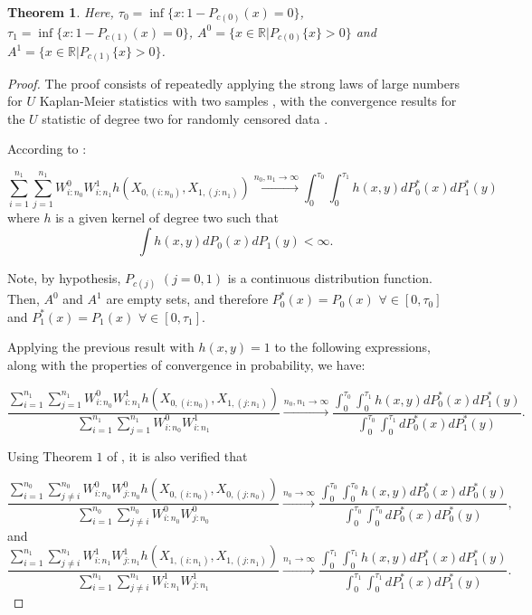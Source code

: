 \documentclass[11pt]{article}
\newtheorem{theorem}{Theorem}
\begin{document}
\begin{appendices}
\begin{theorem}{\label{consistencia}}
	Here,
	$\tau_0=\inf\{x:1-P_{c(0)}(x)=0\}$, $\tau_1=\inf\{x:1-P_{c(1)}(x)=0\}$, $A^{0}=\{x\in \mathbb{R}| P_{c(0)}\{x\}>0\}$ and $A^{1}=\{x\in \mathbb{R}| P_{c(1)}\{x\}>0\}$. 
\end{theorem}
\begin{proof}
	
	
	
	The proof consists of repeatedly applying the strong laws of large numbers for $U$ Kaplan-Meier statistics with two samples \cite{stute1993multi}, with the convergence results for the $U$ statistic of degree two for randomly censored data \cite{bose1999strong}. 
	
	According to \cite{stute1993multi}:
	
	
	$$ \sum_{i=1}^{n_1} \sum_{j=1}^{n_1} W^{0}_{i:n_0} W^{1}_{i:n_1} h(X_{0,(i:n_0)},X_{1,(j:n_1)}) \overset{n_0,n_1\to \infty}{\to} \int_{0}^{\tau_0} \int_{0}^{\tau_1} h(x,y) dP_0^{*}(x)dP_1^{*}(y) $$
	where $h$ is a given kernel of degree two such that	
	$$ \int h(x,y) dP_0(x) dP_1(y)< \infty. $$
	
	
	Note, by hypothesis,  $ P_{c(j)}$ $(j = 0,1) $ is a continuous distribution function. Then, $A^{0}$ and $A^{1}$ are empty sets, and therefore $P^{*}_0(x)= P_0(x)$ $\forall \in[0,\tau_0]$  and $P^{*}_1(x)= P_1(x)$ $\forall\in[0,\tau_1]$.
	
	
	Applying the previous result with $h(x,y)=1$ to the following expressions, along with the properties of convergence in probability,  we have:
	
	$$    \frac{\sum_{i=1}^{n_1} \sum_{j=1}^{n_1} W^{0}_{i:n_0} W^{1}_{i:n_1} h(X_{0,(i:n_0)},X_{1,(j:n_1)})}{\sum_{i=1}^{n_1} \sum_{j=1}^{n_1} W^{0}_{i:n_0} W^{1}_{i:n_1}} \overset{n_0,n_1\to \infty}{\to} \frac{\int_{0}^{\tau_0} \int_{0}^{\tau_1} h(x,y) dP_0^{*}(x) dP_1^{*}(y)}{\int_{0}^{\tau_0} \int_{0}^{\tau_1}  dP_0^{*}(x) dP_1^{*}(y)}. $$
	
	
	Using Theorem $1$ of \cite{bose1999strong},  it is also verified that 
	
	
	$$\frac{\sum_{i=1}^{n_0}  \sum_{j\neq i}^{n_0} W^{0}_{i:n_0} W^{0}_{j:n_0} h(X_{0,(i:n_0)},X_{0,(j:n_0)})}{\sum_{i=1}^{n_0}  \sum_{j\neq i}^{n_0} W^{0}_{i:n_0} W^{0}_{j:n_0}} \overset{n_0 \to \infty}{\to} \frac{\int_{0}^{\tau_0} \int_{0}^{\tau_0} h(x,y)	  dP_0^{*}(x) dP_0^{*}(y)}{\int_{0}^{\tau_0} \int_{0}^{\tau_0} dP_0^{*}(x) dP_0^{*}(y)}, $$
	     and	
	$$\frac{\sum_{i=1}^{n_1}  \sum_{j\neq i}^{n_1} W^{1}_{i:n_1} W^{1}_{j:n_1} h(X_{1,(i:n_1)},X_{1,(j:n_1)})}{\sum_{i=1}^{n_1}  \sum_{j\neq i}^{n_1} W^{1}_{i:n_1} W^{1}_{j:n_1}} \overset{n_1 \to \infty}{\to} \frac{\int_{0}^{\tau_1} \int_{0}^{\tau_1} h(x,y)	  dP_1^{*}(x) dP_1^{*}(y)}{\int_{0}^{\tau_1} \int_{0}^{\tau_1} dP_1^{*}(x) dP_1^{*}(y)}. $$
	

\end{proof}
\end{appendices}
\end{document}
